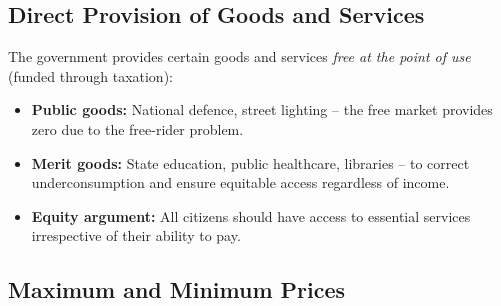 \documentclass[11pt, a4paper, twoside]{book}
\begin{document}
\subsection{Direct Provision of Goods and Services}

The government provides certain goods and services \emph{free at the point of use} (funded through taxation):

\begin{itemize}
  \item \textbf{Public goods:} National defence, street lighting -- the free market provides zero due to the free-rider problem.
  \item \textbf{Merit goods:} State education, public healthcare, libraries -- to correct underconsumption and ensure equitable access regardless of income.
  \item \textbf{Equity argument:} All citizens should have access to essential services irrespective of their ability to pay.
\end{itemize}

\subsection{Maximum and Minimum Prices}
\end{document}
